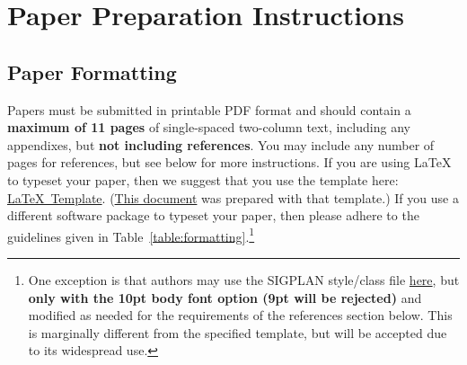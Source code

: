 \documentclass[pageno]{jpaper}
\begin{document}
\section{Paper Preparation Instructions}

\subsection{Paper Formatting}

Papers must be submitted in printable PDF format and should contain a
{\bf maximum of 11 pages} of single-spaced two-column text, including any
appendixes, but {\bf not
  including references}.  You may include any number of pages for
references, but see below for more instructions.  If you are using
\LaTeX~\cite{lamport94} to typeset your paper, then we suggest that
you use the template here:
\href{https://asplos-conference.org/wp-content/uploads/2019/07/asplos20-latex-template.tar.gz}{\LaTeX~Template}.
(\href{https://asplos-conference.org/wp-content/uploads/2019/07/asplos20-template.pdf}{This
  document} was prepared with that template.)  If you use a different
software package to typeset your paper, then please adhere to the
guidelines given in Table~\ref{table:formatting}.\footnote{One
  exception is that authors may use the SIGPLAN style/class file
  \href{http://classic.sigplan.org/sigplanconf.cls}{here}, but {\bf
    only with the 10pt body font option (9pt will be rejected)} and
  modified as needed for the requirements of the references section
  below.  This is marginally different from the specified template,
  but will be accepted due to its widespread use.}
\end{document}

